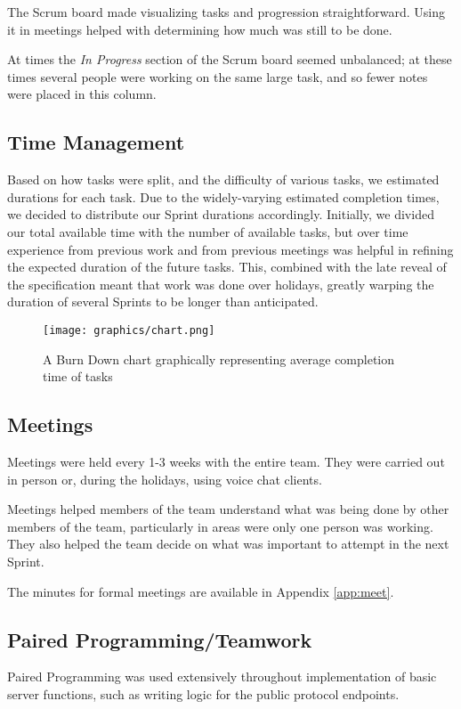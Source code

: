 \documentclass{article}
\begin{document}
The Scrum board made visualizing tasks and progression straightforward.
Using it in meetings helped with determining how much was still to be done.

At times the \emph{In Progress} section of the Scrum board seemed unbalanced;
at these times several people were working on the same large task, and so fewer
notes were placed in this column.

\subsection{Time Management}
Based on how tasks were split, and the difficulty of various tasks, we estimated
durations for each task. Due to the widely-varying estimated completion times,
we decided to distribute our Sprint durations accordingly.
Initially, we divided our total available time with the number of available tasks,
but over time experience from previous work and from previous meetings was helpful in
refining the expected duration of the future tasks.
This, combined with
the late reveal of the specification meant that work was done over holidays, greatly 
warping the duration of several Sprints to be longer than anticipated.

\begin{figure}[H]
\centering
    \texttt{[image: graphics/chart.png]}
    \caption{A Burn Down chart graphically representing average completion time of tasks}
    \label{fig:burndown}
\end{figure}

\subsection{Meetings}
Meetings were held every 1-3 weeks with the entire team.
They were carried out in person or, during the holidays, using
voice chat clients.

Meetings helped members of the team understand what was being done by
other members of the team, particularly in areas were only one person
was working. They also helped the team decide on what was important to
attempt in the next Sprint.

The minutes for formal meetings are available in Appendix \ref{app:meet}.

\subsection{Paired Programming/Teamwork}
Paired Programming was used extensively throughout implementation of basic server
functions, such as writing logic for the public protocol endpoints.
\end{document}

